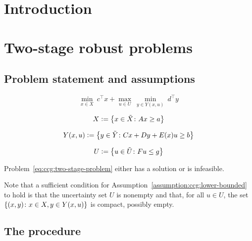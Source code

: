 \section{Introduction}

\section{Two-stage robust problems}

\subsection{Problem statement and assumptions}

\begin{equation}
    \label{eq:ccg:two-stage-problem}
    \min_{x\in X} \ c^\top x + \max_{ u\in U } \ \min_{y\in Y(x,u)} \ d^\top y
\end{equation}

\begin{equation*}
    X \mathrel{{\mathop:}{=}} \left\{ x\in \tilde{X} \colon Ax \ge a \right\}
\end{equation*}

\begin{equation*}
    Y(x,u) \mathrel{{\mathop:}{=}} \left\{ y\in \tilde{Y} \colon Cx + Dy + E(x)u \ge b \right\}
\end{equation*}

\begin{equation*}
    U \mathrel{{\mathop:}{=}} \left\{ u\in\tilde{U} \colon Fu \le g \right\}
\end{equation*}

\begin{assumption}
    \label{assumption:ccg:lower-bounded}
    Problem~\eqref{eq:ccg:two-stage-problem} either has a solution or is
    infeasible. 
\end{assumption}

Note that a sufficient condition for
Assumption~\ref{assumption:ccg:lower-bounded} to hold is that the uncertainty
set $U$ is nonempty and that, for all $u\in U$, the set $\left\{ (x,y) \colon
x\in X, y\in Y(x,u) \right\}$ is compact, possibly empty.

\subsection{The procedure}

